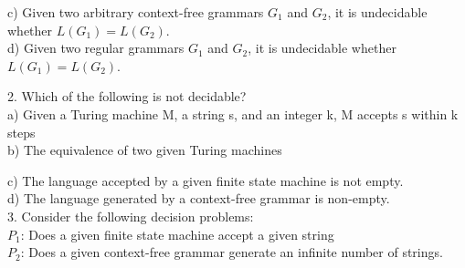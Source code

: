 \documentclass[11pt]{article}
\begin{document}
\vspace*{0.1cm}
\hspace*{0.5cm} c) Given two arbitrary context-free grammars $G _{1}$ and $G _{2}$, it is undecidable whether $L(G _{1}) =
L(G _{2})$.\\

\vspace*{0.1cm}
\hspace*{0.5cm} d) Given two regular grammars $G _{1}$ and $G _{2}$, it is undecidable whether $L(G _{1}) = L(G _{2})$.\\

\vspace*{0.2cm}

\hspace*{-0.4cm}
2. Which of the following is not decidable?\\

\vspace*{0.1cm}
\hspace*{0.5cm} a) Given a Turing machine M, a string s, and an integer k, M accepts s within k steps\\

\vspace*{0.1cm}
\hspace*{0.5cm} b) The equivalence of two given Turing machines\\

\vspace*{0.1cm}

\hspace*{0.5cm} c) The language accepted by a given finite state machine is not empty.\\

\vspace*{0.1cm}
\hspace*{0.5cm} d) The language generated by a context-free grammar is non-empty.\\

\vspace*{0.2cm}
\hspace*{-0.4cm}
3. Consider the following decision problems:\\

\vspace*{0.1cm}
\hspace*{0.5cm} $P _{1}$: Does a given finite state machine accept a given string\\

\vspace*{0.1cm}
\hspace*{0.5cm} $P _{2}$: Does a given context-free grammar generate an infinite number of strings.\\
\end{document}
